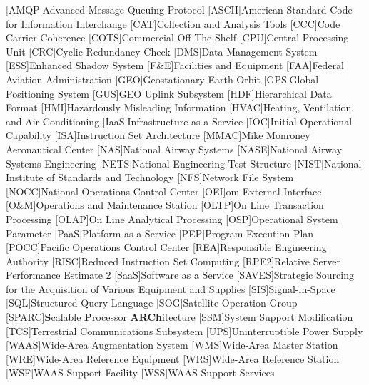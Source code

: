 \begin{acronym}[WAAS]
[AMQP]{Advanced Message Queuing Protocol}
[ASCII]{American Standard Code for Information Interchange}
[CAT]{Collection and Analysis Tools}
[CCC]{Code Carrier Coherence}
[COTS]{Commercial Off-The-Shelf}
[CPU]{Central Processing Unit}
[CRC]{Cyclic Redundancy Check}
[DMS]{Data Management System}
[ESS]{Enhanced Shadow System}
[F\&E]{Facilities and Equipment}
[FAA]{Federal Aviation Administration}
[GEO]{Geostationary Earth Orbit}
[GPS]{Global Positioning System}
[GUS]{GEO Uplink Subsystem}
[HDF]{Hierarchical Data Format}
[HMI]{Hazardously Misleading Information}
[HVAC]{Heating, Ventilation, and Air Conditioning}
[IaaS]{Infrastructure as a Service}
[IOC]{Initial Operational Capability}
[ISA]{Instruction Set Architecture}
[MMAC]{Mike Monroney Aeronautical Center}
[NAS]{National Airway Systems}
[NASE]{National Airway Systems Engineering}
[NETS]{National Engineering Test Structure}
[NIST]{National Institute of Standards and Technology}
[NFS]{Network File System}
[NOCC]{National Operations Control Center}
[OEI]{\ac{om} External Interface}
[O\&M]{Operations and Maintenance Station}
[OLTP]{On Line Transaction Processing}
[OLAP]{On Line Analytical Processing}
[OSP]{Operational System Parameter}
[PaaS]{Platform as a Service}
[PEP]{Program Execution Plan}
[POCC]{Pacific Operations Control Center}
[REA]{Responsible Engineering Authority}
[RISC]{Reduced Instruction Set Computing}
[RPE2]{Relative Server Performance Estimate 2}
[SaaS]{Software as a Service}
[SAVES]{Strategic Sourcing for the Acquisition of Various Equipment and Supplies}
[SIS]{Signal-in-Space}
[SQL]{Structured Query Language}
[SOG]{Satellite Operation Group}
[SPARC]{\textbf{S}calable \textbf{P}rocessor \textbf{ARCh}itecture}
[SSM]{System Support Modification}
[TCS]{Terrestrial Communications Subsystem}
[UPS]{Uninterruptible Power Supply}
[WAAS]{Wide-Area Augmentation System}
[WMS]{Wide-Area Master Station}
[WRE]{Wide-Area Reference Equipment}
[WRS]{Wide-Area Reference Station}
[WSF]{WAAS Support Facility}
[WSS]{WAAS Support Services}
\end{acronym}

